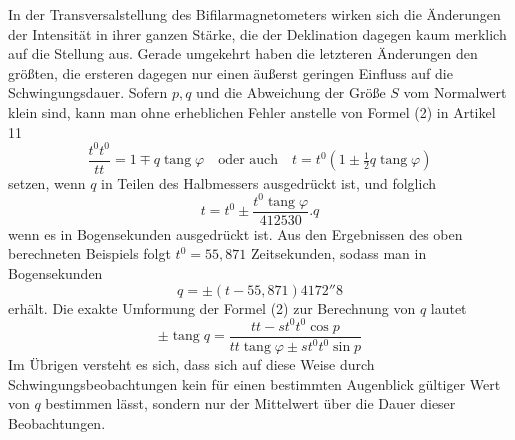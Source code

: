 In der Transversalstellung des Bifilarmagnetometers wirken sich die Änderungen der Intensität in ihrer ganzen Stärke, die der Deklination dagegen kaum merklich auf die Stellung aus. Gerade umgekehrt haben die letzteren Änderungen den größten, die ersteren dagegen nur einen äußerst geringen Einfluss auf die Schwingungsdauer. Sofern $p,q$ und die Abweichung der Größe $S$ vom Normalwert klein sind, kann man ohne erheblichen Fehler anstelle von Formel (2) in Artikel 11
\[
\frac{t^0t^0}{tt}=1\mp q\operatorname{tang}\varphi\quad\text{oder auch}\quad t=t^0(1\pm\tfrac12q\operatorname{tang}\varphi)
\]
setzen, wenn $q$ in Teilen des Halbmessers ausgedrückt ist, und folglich
\[
t=t^0\pm\frac{t^0\operatorname{tang}\varphi}{412530}.q
\]
wenn es in Bogensekunden ausgedrückt ist. Aus den Ergebnissen des oben berechneten Beispiels folgt $t^0=55{,}871$ Zeitsekunden, sodass man in Bogensekunden
\[
q=\pm(t-55{,}871)4172''8
\]
erhält. Die exakte Umformung der Formel (2) zur Berechnung von $q$ lautet
\[
\pm\operatorname{tang}q=\frac{tt-st^0t^0\cos p}{tt\operatorname{tang}\varphi\pm st^0t^0\sin p}
\]
Im Übrigen versteht es sich, dass sich auf diese Weise durch Schwin\-gungsbeobachtungen kein für einen bestimmten Augenblick gültiger Wert von $q$ bestimmen lässt, sondern nur der Mittelwert über die Dauer dieser Beobachtungen.

